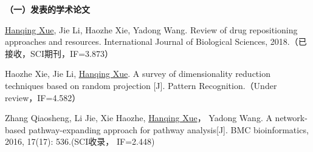 
\begin{publication}
\noindent\textbf{（一）发表的学术论文}
\begin{publist}
\item	\underline{Hanqing Xue}, Jie Li, Haozhe Xie, Yadong Wang. Review of drug repositioning approaches and resources. International Journal of Biological Sciences, 2018.（已接收，SCI期刊，IF=3.873）

\item Haozhe Xie, Jie Li, \underline{Hanqing Xue}. A survey of dimensionality reduction techniques
based on random projection [J]. Pattern Recognition.（Under review，IF=4.582）

\item Zhang Qiaosheng, Li Jie, Xie Haozhe, \underline{Hanqing Xue}， Yadong Wang. A network-based pathway-expanding approach for pathway analysis[J]. BMC bioinformatics, 2016, 17(17): 536.(SCI收录， IF=2.448)

\end{publist}


\end{publication}
